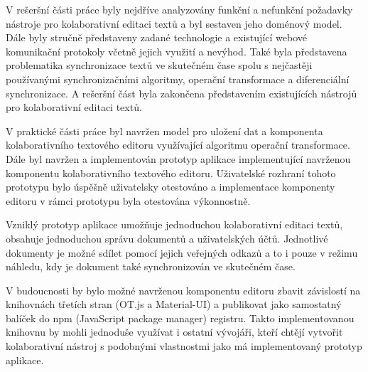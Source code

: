 
\begin{conclusion}

    V rešeršní části práce byly nejdříve analyzovány funkční a nefunkční požadavky nástroje pro kolaborativní editaci textů a byl sestaven jeho doménový model.
    Dále byly stručně představeny zadané technologie a existující webové komunikační protokoly včetně jejich využití a nevýhod.
    Také byla představena problematika synchronizace textů ve skutečném čase spolu s nejčastěji používanými synchronizačními algoritmy, operační transformace a diferenciální synchronizace.
    A rešeršní část byla zakončena představením existujících nástrojů pro kolaborativní editaci textů.

    V praktické části práce byl navržen model pro uložení dat a komponenta kolaborativního textového editoru využívající algoritmu operační transformace.
    Dále byl navržen a implementován prototyp aplikace implementující navrženou komponentu kolaborativního textového editoru.
    Uživatelské rozhraní tohoto prototypu bylo úspěšně uživatelsky otestováno a implementace komponenty editoru v rámci prototypu byla otestována výkonnostně.

    Vzniklý prototyp aplikace umožňuje jednoduchou kolaborativní editaci textů, obsahuje jednoduchou správu dokumentů a uživatelských účtů.
    Jednotlivé dokumenty je možné sdílet pomocí jejich veřejných odkazů a to i pouze v režimu náhledu, kdy je dokument také synchronizován ve skutečném čase.

    V budoucnosti by bylo možné navrženou komponentu editoru zbavit závislostí na knihovnách třetích stran (OT.js a Material-UI) a publikovat jako samostatný balíček do npm (JavaScript package manager) registru.
    Takto implementovanou knihovnu by mohli jednoduše využívat i ostatní vývojáři, kteří chtějí vytvořit kolaborativní nástroj s podobnými vlastnostmi jako má implementovaný prototyp aplikace.

\end{conclusion}
